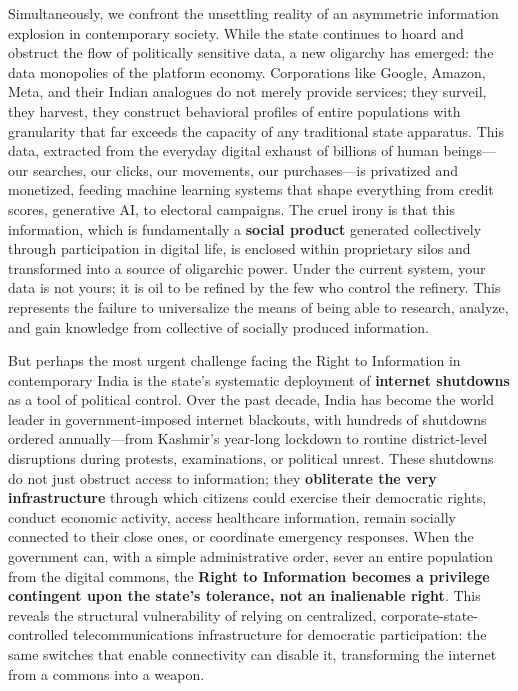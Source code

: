 Simultaneously, we confront the unsettling reality of an asymmetric
information explosion in contemporary society. While the state continues
to hoard and obstruct the flow of politically sensitive data, a new
oligarchy has emerged: the data monopolies of the platform economy.
Corporations like Google, Amazon, Meta, and their Indian analogues do
not merely provide services; they surveil, they harvest, they construct
behavioral profiles of entire populations with granularity that far
exceeds the capacity of any traditional state apparatus. This data,
extracted from the everyday digital exhaust of billions of human
beings---our searches, our clicks, our movements, our purchases---is
privatized and monetized, feeding machine learning systems that shape
everything from credit scores, generative AI, to electoral campaigns.
The cruel irony is that this information, which is fundamentally a
\textbf{social product} generated collectively through participation in
digital life, is enclosed within proprietary silos and transformed into
a source of oligarchic power. Under the current system, your data is not
yours; it is oil to be refined by the few who control the refinery. This
represents the failure to universalize the means of being able to
research, analyze, and gain knowledge from collective of socially
produced information.

But perhaps the most urgent challenge facing the Right to Information in
contemporary India is the state's systematic deployment of
\textbf{internet shutdowns} as a tool of political control. Over the
past decade, India has become the world leader in government-imposed
internet blackouts, with hundreds of shutdowns ordered annually---from
Kashmir's year-long lockdown to routine district-level disruptions
during protests, examinations, or political unrest. These shutdowns do
not just obstruct access to information; they \textbf{obliterate the
very infrastructure} through which citizens could exercise their
democratic rights, conduct economic activity, access healthcare
information, remain socially connected to their close ones, or
coordinate emergency responses. When the government can, with a simple
administrative order, sever an entire population from the digital
commons, the \textbf{Right to Information becomes a privilege contingent
upon the state's tolerance, not an inalienable right}. This reveals the
structural vulnerability of relying on centralized,
corporate-state-controlled telecommunications infrastructure for
democratic participation: the same switches that enable connectivity can
disable it, transforming the internet from a commons into a weapon.

